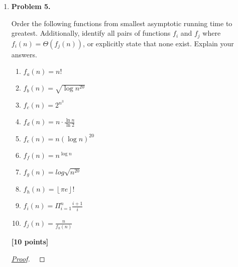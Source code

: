 \documentclass[11pt]{article}
\newcommand{\floor}[1]{\left\lfloor #1 \right\rfloor}
\begin{document}
\begin{enumerate}
\begin{proof}[\underline{Proof}]
Since each \(x_i \ge 0\), we have \(x_1x_4 + x_2x_3 \ge 0\). Hence

\[x_1x_3+x_2x_4 = 1-(x_1x_4+x_2x_3) \le 1,\]

which contradicts the given hypothesis \(x_1x_3+x_2x_4>1\).

\underline{Conclusion.} The assumption that all four numbers are nonnegative is false; at least one of $x_1,x_2,x_3,x_4$ must be negative.

\end{proof}

\newpage

\item \textbf{Problem 5.}

Order the following functions from smallest asymptotic running time to greatest. Additionally, identify all pairs of functions \(f_i\) and \(f_j\) where \(f_i(n) = \Theta(f_j (n))\), or explicitly state that none exist. Explain your answers.

\begin{enumerate}
\item \(f_a(n) = n!\)
\item \(f_b(n) = \sqrt{\log{n^{20}}}\)
\item \(f_c(n) = 2^{n^{3}}\)
\item \(f_d(n) = n \cdot \frac{\ln n}{\ln 2}\)
\item \(f_e(n) = n(\log{n})^{20}\)
\item \(f_f(n) = n^{\log{n}}\)
\item \(f_g(n) = log{\sqrt{n^{20}}}\)
\item \(f_h(n) = \floor{\pi e}!\)
\item \(f_i(n) = \Pi^{n}_{i=1} \frac{i+1}{i}\)
\item \(f_j(n) = \frac{n}{f_h(n)}\)
\end{enumerate}

\begin{flushright}
\textbf{[10 points]}
\end{flushright}

\begin{proof}[\underline{Proof}]
\


\end{proof}
\end{enumerate}
\end{document}
